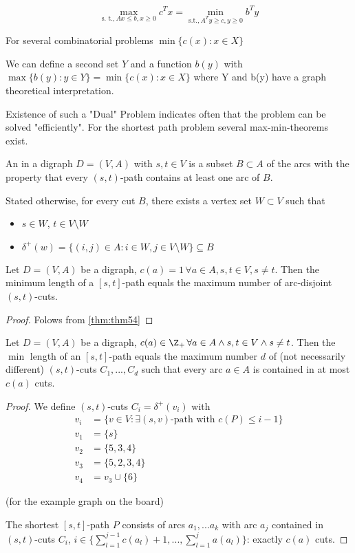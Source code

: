 \[\max_{\text{s. t.}, Ax \leq b, x \geq 0} c^Tx = \min_{\text{s.t.}, A^T y \geq c, y \geq 0} b^T y\]

For several combinatorial problems $\min\{c(x): x \in X\}$

We can define a second set $Y$ and a function $b(y)$ with $\max\{b(y): y \in Y \} = \min \{ c(x): x \in X\}$ where Y and b(y) have a graph theoretical interpretation. 

Existence of such a "Dual" Problem indicates often that the problem can be solved "efficiently". For the shortest path problem several max-min-theorems exist.

\begin{defn}
An  in a digraph $D=(V,A)$ with $s,t \in V$ is a subset $B \subset A$ of the arcs with the property that every $(s,t)$-path contains at least one arc of $B$.

Stated  otherwise, for every cut $B$, there exists a vertex set $W \subset V$ such that
\begin{itemize}
	\item $s \in W$, $t \in V \setminus W$
	\item $\delta^+(w) = \{(i,j) \in A: i \in W, j \in V \setminus W\} \subseteq B$
\end{itemize}
\end{defn}

\begin{thm}
	Let $D=(V,A)$ be a digraph, $c(a)=1 \, \forall a \in A, s,t \in V, s \neq t$. Then the minimum length of a $[s,t]$-path equals the maximum number of arc-disjoint $(s,t)$-cuts. 
\end{thm}

\begin{proof}
	Folows from \ref{thm:thm54} %
\end{proof}

\begin{thm}\label{thm:thm54} %
	Let $D=(V,A)$ be a digraph, $c(a) \in \Z_+ \, \forall a \in A \wedge s,t \in V \wedge s\neq t$. Then the $\min$ length of an $[s,t]$-path equals the maximum number $d$ of (not necessarily different) $(s,t)$-cuts $C_1, ..., C_d$ such that every arc $a \in A$ is contained in at most $c(a)$ cuts.
\end{thm}

\begin{proof}
	We define $(s, t)$-cuts $C_i = \delta^+(v_i)$ with
	\begin{align*}
		v_i & = \{v \in V: \exists \text{$(s,v)$-path with $c(P)\leq i-1$}\} \\
		v_1 & = \{s\} \\
		v_2 & = \{5,3,4\} \\
		v_3 & = \{5,2,3,4\} \\
		v_4 & = v_3 \cup \{ 6 \}
	\end{align*}
	
	(for the example graph on the board)
	
	The shortest $[s,t]$-path $P$ consists of arcs $a_1, ... a_k$ with arc $a_j$ contained in $(s,t)$-cuts $C_i$,  $i \in \{\sum_{l=1}^{j-1} c(a_l) + 1, ..., \sum_{l=1}^j a(a_l)\}$: exactly $c(a)$ cuts.
\end{proof}	
